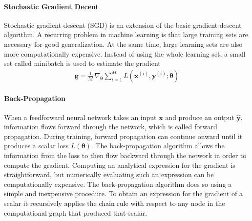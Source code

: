 \documentclass{scrartcl}
\begin{document}
\paragraph{Stochastic Gradient Decent}
Stochastic gradient descent (SGD) is an extension of the basic gradient descent algorithm. A recurring problem in machine learning is that large training sets are necessary for good generalization. At the same time, large learning sets are also more computationally expensive. Instead of using the whole learning set, a small set called minibatch is used to estimate the gradient
\begin{align}
\mathbf g = \frac{1}{M} \,\nabla_{\boldsymbol \theta} \sum_{i=1}^M L(\mathbf x^{(i)}, \mathbf y^{(i)}; \boldsymbol \theta)
\end{align}  

\paragraph{Back-Propagation}
When a feedforward neural network takes an input $\mathbf x$ and produce an output $\hat{\mathbf y}$, information flows forward through the network, which is called forward propagation. During training, forward propagation can continue onward until it produces a scalar loss $L(\boldsymbol \theta)$. The back-propagation algorithm \cite{Rumelhart1988} allows the information from the loss to then flow backward through the network in order to compute the gradient. Computing an analytical expression for the gradient is straightforward, but numerically evaluating such an expression can be computationally expensive. The back-propagation algorithm does so using a simple and inexpensive procedure. To obtain an expression for the gradient of a scalar it recursively applies the chain rule with respect to any node in the computational graph that produced that scalar. 
\end{document}
